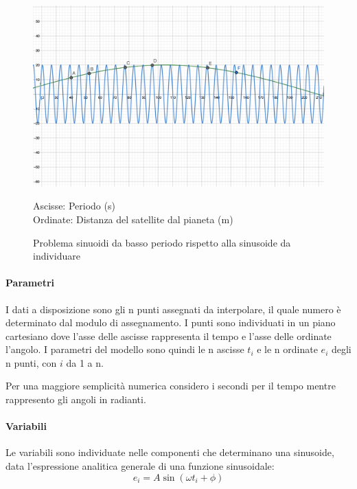 \documentclass[a4paper,12pt]{report}
\begin{document}
\begin{figure}[H]
  \caption{Problema sinuoidi da basso periodo rispetto alla sinusoide da individuare}
  \begin{center}
  \includegraphics[scale=0.05]{img/bassoperiodo3.png}
  \end{center}
    Ascisse: Periodo (s) \\ Ordinate: Distanza del satellite dal pianeta (m)
  \label{fig:bassoperiodo3}
\end{figure}


\paragraph{Parametri}
\label{p:parametri}
I dati a disposizione sono gli n punti assegnati da interpolare, il quale numero è determinato dal modulo di assegnamento. I punti sono individuati in un piano cartesiano dove l'asse delle ascisse rappresenta il tempo e l'asse delle ordinate l'angolo. I parametri del modello sono quindi le n ascisse $t_i$ e le n ordinate $e_i$ degli n punti, con $i$ da 1 a n.

Per una maggiore semplicità numerica considero i secondi per il tempo mentre rappresento gli angoli in radianti.


\paragraph{Variabili}
\label{p:variabili}
Le variabili sono individuate nelle componenti che determinano una sinusoide, data l'espressione analitica generale di una funzione sinusoidale:
\begin{equation}
e_i = A\sin(\omega t_i + \phi)
\end{equation}
\end{document}
